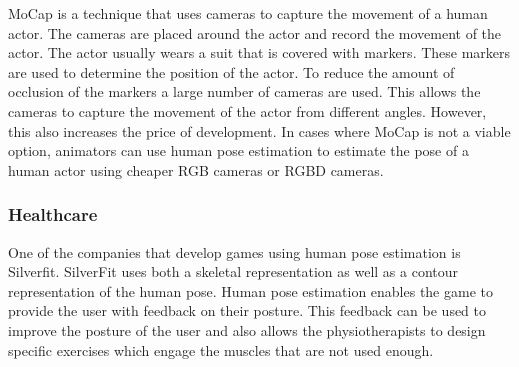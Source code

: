 MoCap is a technique that uses cameras to capture the movement of a human actor. The cameras are placed around the actor and record the movement of the actor. The actor usually wears a suit that is covered with markers. These markers are used to determine the position of the actor. To reduce the amount of occlusion of the markers a large number of cameras are used. This allows the cameras to capture the movement of the actor from different angles. However, this also increases the price of development. In cases where MoCap is not a viable option, animators can use human pose estimation to estimate the pose of a human actor using cheaper RGB cameras or RGBD cameras.

\subsubsection{Healthcare}

One of the companies that develop games using human pose estimation is Silverfit. SilverFit uses both a skeletal representation as well as a contour representation of the human pose. Human pose estimation enables the game to provide the user with feedback on their posture. This feedback can be used to improve the posture of the user and also allows the physiotherapists to design specific exercises which engage the muscles that are not used enough.